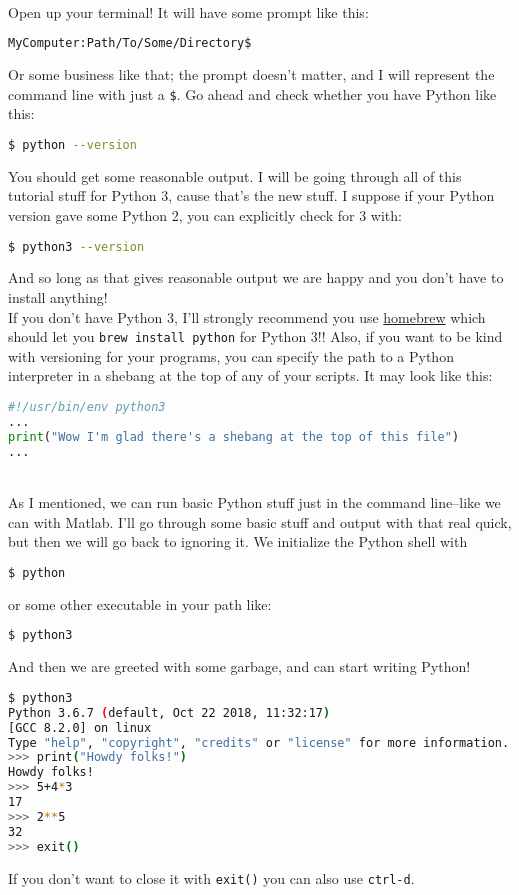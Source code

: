 \documentclass[12pt]{article}
\begin{document}
\\

Open up your terminal! It will have some prompt like this:\\
\begin{lstlisting}[language=sh]
MyComputer:Path/To/Some/Directory$
\end{lstlisting}
Or some business like that; the prompt doesn't matter, and I will represent the command line with just a \texttt{\$}. Go ahead and check whether you have Python like this:\\
\begin{lstlisting}[language=sh]
$ python --version
\end{lstlisting}
You should get some reasonable output. I will be going through all of this tutorial stuff for Python 3, cause that's the new stuff. I suppose if your Python version gave some Python 2, you can explicitly check for 3 with:\\
\begin{lstlisting}[language=sh]
$ python3 --version
\end{lstlisting}
And so long as that gives reasonable output we are happy and you don't have to install anything!\\
If you don't have Python 3, I'll strongly recommend you use \href{https://brew.sh/}{homebrew} which should let you \texttt{brew install python} for Python 3!! Also, if you want to be kind with versioning for your programs, you can specify the path to a Python interpreter in a shebang at the top of any of your scripts. It may look like this:\\
\begin{lstlisting}[language=Python]
#!/usr/bin/env python3
...
print("Wow I'm glad there's a shebang at the top of this file")
...
\end{lstlisting}

\\

As I mentioned, we can run basic Python stuff just in the command line--like we can with Matlab. I'll go through some basic stuff and output with that real quick, but then we will go back to ignoring it. We initialize the Python shell with\\
\begin{lstlisting}[language=sh]
$ python
\end{lstlisting}
or some other executable in your path like:\\
\begin{lstlisting}[language=sh]
$ python3
\end{lstlisting}
And then we are greeted with some garbage, and can start writing Python!\\
\begin{lstlisting}[language=sh]
$ python3
Python 3.6.7 (default, Oct 22 2018, 11:32:17) 
[GCC 8.2.0] on linux
Type "help", "copyright", "credits" or "license" for more information.
>>> print("Howdy folks!")
Howdy folks!
>>> 5+4*3
17
>>> 2**5
32
>>> exit()
\end{lstlisting}
If you don't want to close it with \texttt{exit()} you can also use \texttt{ctrl-d}.\\
\end{document}

